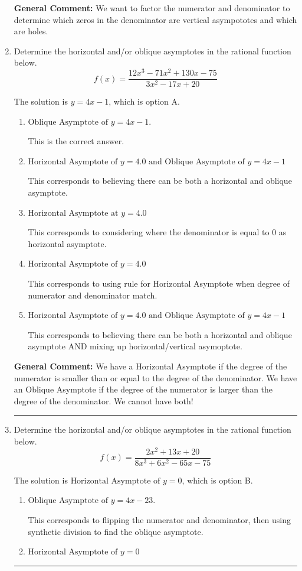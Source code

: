 \documentclass{extbook}[14pt]
\newcommand{\litem}[1]{\item #1

\rule{\textwidth}{0.4pt}}
\begin{document}
\begin{enumerate}
{\textbf{General Comment:} We want to factor the numerator and denominator to determine which zeros in the denominator are vertical asympototes and which are holes.
}
\litem{
Determine the horizontal and/or oblique asymptotes in the rational function below.
\[ f(x) = \frac{12x^{3} -71 x^{2} +130 x -75}{3x^{2} -17 x + 20} \]

The solution is \( y = 4x -1 \), which is option A.\begin{enumerate}[label=\Alph*.]
\item \( \text{Oblique Asymptote of } y = 4x -1. \)

This is the correct answer.
\item \( \text{Horizontal Asymptote of } y = 4.0 \text{ and Oblique Asymptote of } y = 4x -1 \)

This corresponds to believing there can be both a horizontal and oblique asymptote.
\item \( \text{Horizontal Asymptote at } y = 4.0 \)

This corresponds to considering where the denominator is equal to 0 as horizontal asymptote.
\item \( \text{Horizontal Asymptote of } y = 4.0  \)

This corresponds to using rule for Horizontal Asymptote when degree of numerator and denominator match.
\item \( \text{Horizontal Asymptote of } y = 4.0 \text{ and Oblique Asymptote of } y = 4x -1 \)

This corresponds to believing there can be both a horizontal and oblique asymptote AND mixing up horizontal/vertical asymoptote.
\end{enumerate}

\textbf{General Comment:} We have a Horizontal Asymptote if the degree of the numerator is smaller than or equal to the degree of the denominator. We have an Oblique Asymptote if the degree of the numerator is larger than the degree of the denominator. We cannot have both!
}
\litem{
Determine the horizontal and/or oblique asymptotes in the rational function below.
\[ f(x) = \frac{2x^{2} +13 x + 20}{8x^{3} +6 x^{2} -65 x -75} \]

The solution is \( \text{Horizontal Asymptote of } y = 0 \), which is option B.\begin{enumerate}[label=\Alph*.]
\item \( \text{Oblique Asymptote of } y = 4x -23. \)

This corresponds to flipping the numerator and denominator, then using synthetic division to find the oblique asymptote.
\item \( \text{Horizontal Asymptote of } y = 0 \)


\end{enumerate}}
\end{enumerate}
\end{document}
